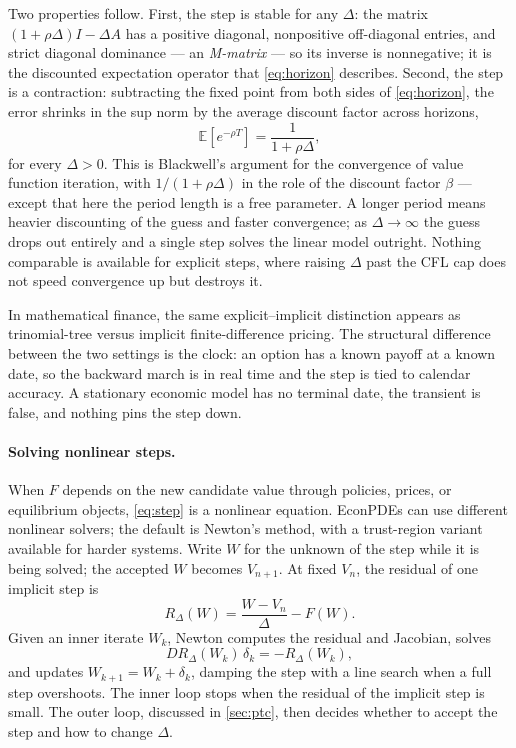 \documentclass[11pt]{article}
\numberwithin{equation}{section}
\begin{document}
	Two properties follow. First, the step is stable for any $\Delta$: the matrix $(1+\rho\Delta) I - \Delta A$ has a positive diagonal, nonpositive off-diagonal entries, and strict diagonal dominance --- an \emph{M-matrix} --- so its inverse is nonnegative; it is the discounted expectation operator that \eqref{eq:horizon} describes. Second, the step is a contraction: subtracting the fixed point from both sides of \eqref{eq:horizon}, the error shrinks in the sup norm by the average discount factor across horizons,
	\begin{equation*}
		\mathbb{E}\left[e^{-\rho T}\right] = \frac{1}{1+\rho \Delta},
	\end{equation*}
		for every $\Delta > 0$. This is Blackwell's argument for the convergence of value function iteration, with $1/(1+\rho\Delta)$ in the role of the discount factor $\beta$ --- except that here the period length is a free parameter. A longer period means heavier discounting of the guess and faster convergence; as $\Delta \to \infty$ the guess drops out entirely and a single step solves the linear model outright. Nothing comparable is available for explicit steps, where raising $\Delta$ past the CFL cap does not speed convergence up but destroys it.

		In mathematical finance, the same explicit--implicit distinction appears as trinomial-tree versus implicit finite-difference pricing. The structural difference between the two settings is the clock: an option has a known payoff at a known date, so the backward march is in real time and the step is tied to calendar accuracy. A stationary economic model has no terminal date, the transient is false, and nothing pins the step down.

			\paragraph*{Solving nonlinear steps.} When $F$ depends on the new candidate value through policies, prices, or equilibrium objects, \eqref{eq:step} is a nonlinear equation. EconPDEs can use different nonlinear solvers; the default is Newton's method, with a trust-region variant available for harder systems. Write $W$ for the unknown of the step while it is being solved; the accepted $W$ becomes $V_{n+1}$. At fixed $V_n$, the residual of one implicit step is
		\begin{equation*}
			R_\Delta(W) = \frac{W-V_n}{\Delta} - F(W).
		\end{equation*}
		Given an inner iterate $W_k$, Newton computes the residual and Jacobian, solves
		\begin{equation*}
			D R_\Delta(W_k)\, \delta_k = -R_\Delta(W_k),
		\end{equation*}
		and updates $W_{k+1}=W_k+\delta_k$, damping the step with a line search when a full step overshoots. The inner loop stops when the residual of the implicit step is small. The outer loop, discussed in \cref{sec:ptc}, then decides whether to accept the step and how to change $\Delta$.
\end{document}
